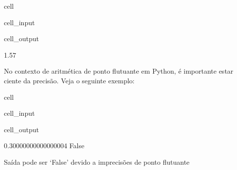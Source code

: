 \documentclass[letterpaper,10pt,english]{jupyterBook}
\begin{document}
\begin{sphinxuseclass}{cell}\begin{sphinxVerbatimInput}

\begin{sphinxuseclass}{cell_input}
\begin{sphinxVerbatim}[commandchars=\\\{\}]
      
\end{sphinxVerbatim}

\end{sphinxuseclass}\end{sphinxVerbatimInput}
\begin{sphinxVerbatimOutput}

\begin{sphinxuseclass}{cell_output}
\begin{sphinxVerbatim}[commandchars=\\\{\}]
1.57
\end{sphinxVerbatim}

\end{sphinxuseclass}\end{sphinxVerbatimOutput}

\end{sphinxuseclass}
\sphinxAtStartPar
No contexto de aritmética de ponto flutuante em Python, é importante estar ciente da precisão. Veja o seguinte exemplo:

\begin{sphinxuseclass}{cell}\begin{sphinxVerbatimInput}

\begin{sphinxuseclass}{cell_input}
\begin{sphinxVerbatim}[commandchars=\\\{\}]
      
    
\end{sphinxVerbatim}

\end{sphinxuseclass}\end{sphinxVerbatimInput}
\begin{sphinxVerbatimOutput}

\begin{sphinxuseclass}{cell_output}
\begin{sphinxVerbatim}[commandchars=\\\{\}]
0.30000000000000004
False
\end{sphinxVerbatim}

\end{sphinxuseclass}\end{sphinxVerbatimOutput}

\end{sphinxuseclass}
\sphinxAtStartPar
Saída pode ser ‘False’ devido a imprecisões de ponto flutuante
\end{document}
